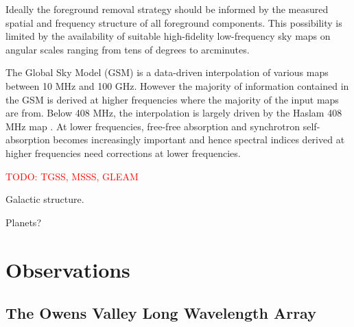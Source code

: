 \documentclass[twocolumn]{aastex6}
\newcommand{\todo}[1]{\textcolor{red}{TODO: #1}\PackageWarning{TODO:}{#1!}}
\begin{document}
Ideally the foreground removal strategy should be informed by the measured spatial and frequency
structure of all foreground components. This possibility is limited by the availability of suitable
high-fidelity low-frequency sky maps on angular scales ranging from tens of degrees to arcminutes.

The Global Sky Model (GSM) \citep{2008MNRAS.388..247D, 2017MNRAS.464.3486Z} is a data-driven
interpolation of various maps between 10 MHz and 100 GHz. However the majority of information
contained in the GSM is derived at higher frequencies where the majority of the input maps are from.
Below 408 MHz, the interpolation is largely driven by the Haslam 408 MHz map
\citep{1981A&A...100..209H, 1982A&AS...47....1H}.  At lower frequencies, free-free absorption and
synchrotron self-absorption becomes increasingly important and hence spectral indices derived at
higher frequencies need corrections at lower frequencies.





\citet{2011A&A...525A.138G}

\todo{TGSS, MSSS, GLEAM}




Galactic structure.

Planets?







\section{Observations}

\subsection{The Owens Valley Long Wavelength Array}
\end{document}
